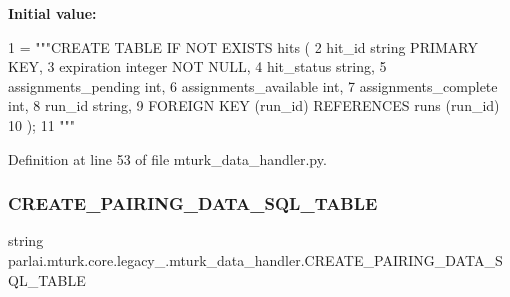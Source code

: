 {\bfseries Initial value\+:}
\begin{DoxyCode}
1 =  \textcolor{stringliteral}{"""CREATE TABLE IF NOT EXISTS hits (}
2 \textcolor{stringliteral}{        hit\_id string PRIMARY KEY,}
3 \textcolor{stringliteral}{        expiration integer NOT NULL,}
4 \textcolor{stringliteral}{        hit\_status string,}
5 \textcolor{stringliteral}{        assignments\_pending int,}
6 \textcolor{stringliteral}{        assignments\_available int,}
7 \textcolor{stringliteral}{        assignments\_complete int,}
8 \textcolor{stringliteral}{        run\_id string,}
9 \textcolor{stringliteral}{        FOREIGN KEY (run\_id) REFERENCES runs (run\_id)}
10 \textcolor{stringliteral}{    );}
11 \textcolor{stringliteral}{    """}
\end{DoxyCode}


Definition at line 53 of file mturk\+\_\+data\+\_\+handler.\+py.

\mbox{\label{namespaceparlai_1_1mturk_1_1core_1_1legacy__2018_1_1mturk__data__handler_a010d52d8ac8e5fbaf2decaa333c8f360}} 
\subsubsection{\texorpdfstring{C\+R\+E\+A\+T\+E\+\_\+\+P\+A\+I\+R\+I\+N\+G\+\_\+\+D\+A\+T\+A\+\_\+\+S\+Q\+L\+\_\+\+T\+A\+B\+LE}{CREATE\_PAIRING\_DATA\_SQL\_TABLE}}
{\footnotesize\ttfamily string parlai.\+mturk.\+core.\+legacy\+\_.\+mturk\+\_\+data\+\_\+handler.\+C\+R\+E\+A\+T\+E\+\_\+\+P\+A\+I\+R\+I\+N\+G\+\_\+\+D\+A\+T\+A\+\_\+\+S\+Q\+L\+\_\+\+T\+A\+B\+LE}

